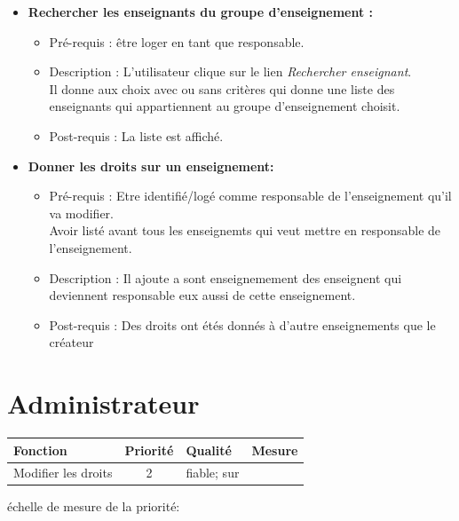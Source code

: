 \begin{itemize}	
\item {\bf Rechercher les enseignants du groupe d'enseignement :}
	\begin{itemize}
	\item Pr{\'e}-requis : {\^e}tre loger en tant que responsable.
	\item Description : L'utilisateur clique sur le lien {\it Rechercher enseignant}.\\
	Il donne aux choix avec ou sans crit{\`e}res qui donne une liste des enseignants qui appartiennent au groupe d'enseignement choisit.
	\item Post-requis : La liste est affich{\'e}.
	\end{itemize}
\item {\bf Donner les droits sur un enseignement:}
	\begin{itemize}
	\item Pr{\'e}-requis : Etre identifi{\'e}/log{\'e} comme responsable de l'enseignement qu'il va modifier.\\
	Avoir list{\'e} avant tous les enseignemts qui veut mettre en responsable de l'enseignement. 
	\item Description : Il ajoute a sont enseignemement des enseignent qui deviennent responsable eux aussi de cette enseignement.
	\item Post-requis : Des droits ont {\'e}t{\'e}s donn{\'e}s {\`a} d'autre enseignements que le cr{\'e}ateur
	\end{itemize}
\end{itemize}

\section*{Administrateur}

\begin{tabular}{|p{4cm}|c|p{4cm}|p{5cm}|}
\hline
  Fonction & Priorit{\'e} & Qualit{\'e} & Mesure \\
\hline
Modifier les droits & 2 & fiable; sur & \\
\hline
\end{tabular}

\begin{center}
{\'e}chelle de mesure de la priorit{\'e}:

\end{center}

